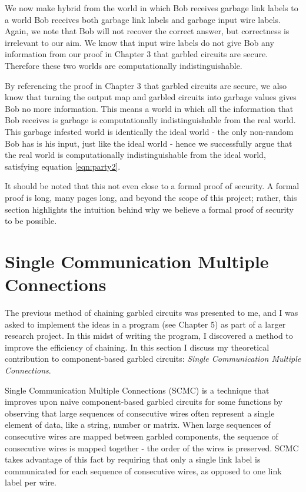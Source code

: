 We now make hybrid from the world in which Bob receives garbage link labels to a world Bob receives both garbage link labels and garbage input wire labels. 
Again, we note that Bob will not recover the correct answer, but correctness is irrelevant to our aim. 
We know that input wire labels do not give Bob any information from our proof in Chapter 3 that garbled circuits are secure. 
Therefore these two worlds are computationally indistinguishable. 

By referencing the proof in Chapter 3 that garbled circuits are secure, we also know that turning the output map and garbled circuits into garbage values gives Bob no more information.
This means a world in which all the information that Bob receives is garbage is computationally indistinguishable from the real world.
This garbage infested world is identically the ideal world - the only non-random Bob has is his input, just like the ideal world - hence we successfully argue that the real world is computationally indistinguishable from the ideal world, satisfying equation \ref{eqn:party2}. 

It should be noted that this not even close to a formal proof of security.
A formal proof is long, many pages long, and beyond the scope of this project; rather, this section highlights the intuition behind why we believe a formal proof of security to be possible. 

\section{Single Communication Multiple Connections}

The previous method of chaining garbled circuits was presented to me, and I was asked to implement the ideas in a program (see Chapter 5) as part of a larger research project. 
In this midst of writing the program, I discovered a method to improve the efficiency of chaining. 
In this section I discuss my theoretical contribution to component-based garbled circuits:  \textit{Single Communication Multiple Connections}.

Single Communication Multiple Connections (SCMC) is a technique that improves upon naive component-based garbled circuits for some functions by observing that large sequences of consecutive wires often represent a single element of data, like a string, number or matrix. 
When large sequences of consecutive wires are mapped between garbled components, the sequence of consecutive wires is mapped together - the order of the wires is preserved. 
SCMC takes advantage of this fact by requiring that only a single link label is communicated for each sequence of consecutive wires, as opposed to one link label per wire. 

